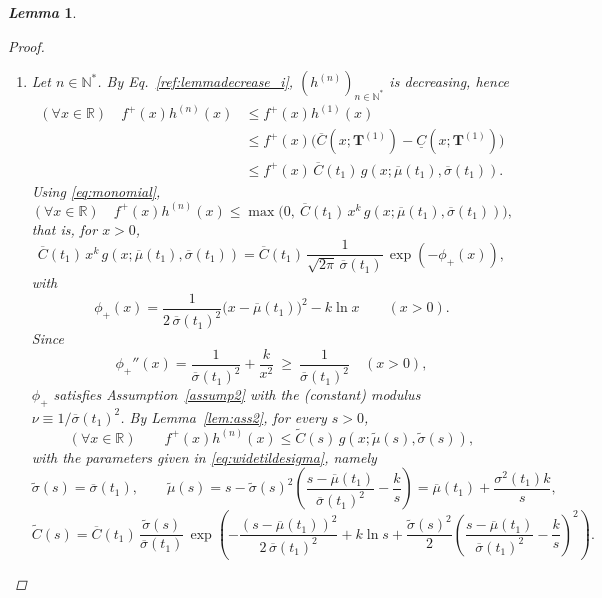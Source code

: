 \documentclass[review]{elsarticle}
\newtheorem{lemma}{\em Lemma}
\begin{document}
\begin{lemma}
\begin{proof}
\begin{enumerate}
    \item[(i)]
Let $n \in \mathbb{N}^*$. By Eq.~\eqref{ref:lemmadecrease_i}, $(h^{(n)})_{n\in\mathbb{N}^*}$ is decreasing, hence
\begin{equation}
\begin{aligned}
(\forall x \in \mathbb{R}) \quad f^+(x) h^{(n)}(x) 
&\leq f^+(x) h^{(1)}(x) \\
&\leq f^+(x)\big(\overline{C}(x;\mathbf{T}^{(1)})-\underline{C}(x;\mathbf{T}^{(1)})\big) \\
&\leq f^+(x)\,\overline{C}(t_1)\,g\!\left(x;\overline{\mu}(t_1),\overline{\sigma}(t_1)\right).
\end{aligned}
\end{equation}
Using \eqref{eq:monomial},
\begin{equation}
(\forall x \in \mathbb{R})\quad 
f^+(x) h^{(n)}(x) \leq \max\!\Big(0,\ \overline{C}(t_1)\,x^k\, g\!\left(x;\overline{\mu}(t_1),\overline{\sigma}(t_1)\right)\Big),
\end{equation}
that is, for $x>0$,
\begin{equation}
\overline{C}(t_1)\,x^k\, g\!\left(x;\overline{\mu}(t_1),\overline{\sigma}(t_1)\right)
=\overline{C}(t_1)\,\frac{1}{\sqrt{2\pi}\,\overline{\sigma}(t_1)}\,
\exp\!\left(-\phi_+(x)\right),
\end{equation}
with
\begin{equation}
\phi_+(x)=\frac{1}{2\,\overline{\sigma}(t_1)^2}\big(x-\overline{\mu}(t_1)\big)^2 - k\ln x
\qquad (x>0).
\end{equation}
Since
\begin{equation}
\phi_+''(x)=\frac{1}{\overline{\sigma}(t_1)^2}+\frac{k}{x^2}\ \ge\ \frac{1}{\overline{\sigma}(t_1)^2}\quad (x>0),
\end{equation}
$\phi_+$ satisfies Assumption~\ref{assump2} with the (constant) modulus $\nu\equiv 1/\overline{\sigma}(t_1)^2$. By Lemma~\ref{lem:ass2}, for every $s>0$,
\begin{equation}
(\forall x\in\mathbb{R})\qquad
f^+(x) h^{(n)}(x) \le \widetilde{C}(s)\, g\!\left(x;\widetilde{\mu}(s),\widetilde{\sigma}(s)\right),
\end{equation}
with the parameters given in \eqref{eq:widetildesigma}, namely
\begin{equation}
\widetilde{\sigma}(s)=\overline{\sigma}(t_1),\qquad
\widetilde{\mu}(s)=s-\widetilde{\sigma}(s)^2\!\left(\frac{s-\overline{\mu}(t_1)}{\overline{\sigma}(t_1)^2}-\frac{k}{s}\right)=\overline{\mu}(t_1)+\frac{\sigma^2(t_1)k}{s},
\end{equation}
\begin{equation}
\widetilde{C}(s)=\overline{C}(t_1)\,\frac{\widetilde{\sigma}(s)}{\overline{\sigma}(t_1)}\,
\exp\!\left(-\frac{(s-\overline{\mu}(t_1))^2}{2\,\overline{\sigma}(t_1)^2}
+ k\ln s
+ \frac{\widetilde{\sigma}(s)^2}{2}\left(\frac{s-\overline{\mu}(t_1)}{\overline{\sigma}(t_1)^2}-\frac{k}{s}\right)^{\!2}\right).
\end{equation}


\end{enumerate}
\end{proof}
\end{lemma}
\end{document}
